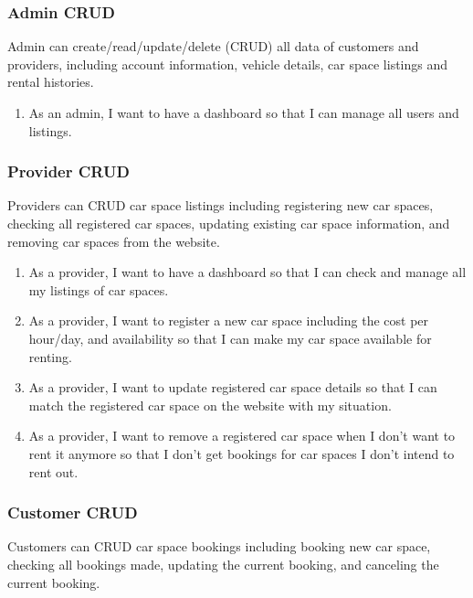 \documentclass[12pt]{article}
\begin{document}
\subsubsection{Admin CRUD}

Admin can create/read/update/delete (CRUD) all data of customers and providers, including account information, vehicle details, car space listings and rental histories.

\begin{enumerate}[resume]
  \item As an admin, I want to have a dashboard so that I can manage all users and listings.
\end{enumerate}

\subsubsection{Provider CRUD}

Providers can CRUD car space listings including registering new car spaces, checking all registered car spaces, updating existing car space information, and removing car spaces from the website.

\begin{enumerate}[resume]
  \item As a provider, I want to have a dashboard so that I can check and manage all my listings of car spaces.
  \item As a provider, I want to register a new car space including the cost per hour/day, and availability so that I can make my car space available for renting.
  \item As a provider, I want to update registered car space details so that I can match the registered car space on the website with my situation.
  \item As a provider, I want to remove a registered car space when I don't want to rent it anymore so that I don't get bookings for car spaces I don't intend to rent out.
\end{enumerate}

\subsubsection{Customer CRUD}

Customers can CRUD car space bookings including booking new car space, checking all bookings made, updating the current booking, and canceling the current booking.
\end{document}
